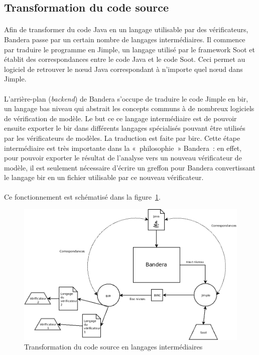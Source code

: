 \subsection{Transformation du code source}
\label{sec:bandera_source}

\paragraph{}
Afin de transformer du code Java en un langage utilisable par des
vérificateurs, Bandera passe par un certain nombre de langages
intermédiaires. Il commence par traduire le programme en Jimple, un
langage utilisé par le framework Soot et établit des correspondances
entre le code Java et le code Soot. Ceci permet au logiciel de
retrouver le n\oe{}ud Java correspondant à n'importe quel n\oe{}ud
dans Jimple.

\paragraph{}
L'arrière-plan (\textit{backend}) de Bandera s'occupe de traduire le
code Jimple en \gls{bir}, un langage bas niveau qui abstrait les
concepts communs à de nombreux logiciels de vérification de modèle. Le
but ce ce langage intermédiaire est de pouvoir ensuite exporter le
\gls{bir} dans différents langages spécialisés pouvant être utilisés
par les vérificateurs de modèles. La traduction est faite par
\gls{birc}. Cette étape intermédiaire est très importante dans la
«~philosophie~» Bandera~: en effet, pour pouvoir exporter le résultat
de l'analyse vers un nouveau vérificateur de modèle, il est seulement
nécessaire d'écrire un greffon pour Bandera convertissant le langage
\gls{bir} en un fichier utilisable par ce nouveau vérificateur.

\paragraph{}
Ce fonctionnement est schématisé dans la figure~\ref{fig:bir_jimple}.

\begin{figure}[H]
  \centering
  \includegraphics[scale=0.5]{images/bandera_bir_jimple.png}
  \caption{\label{fig:bir_jimple} Transformation du code source en
    langages intermédiaires}
\end{figure}

